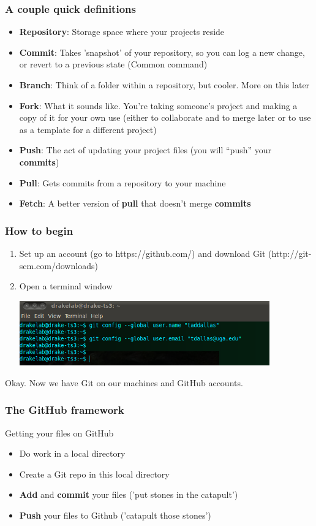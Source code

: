 \documentclass{beamer}\usepackage{graphicx, color}
\begin{document}
\begin{frame}
 \frametitle{A couple quick definitions}
  \begin{itemize}
    \item \textbf{Repository}: Storage space where your projects reside
    \item \textbf{Commit}: Takes 'snapshot' of your repository, so you can log a new change, or revert to a previous state (Common command)
    \item \textbf{Branch}: Think of a folder within a repository, but cooler. More on this later
    \item \textbf{Fork}: What it sounds like. You're taking someone's project and making a copy of it for your own use (either to collaborate and to merge later or to use as a template for a different project)
    \item \textbf{Push}: The act of updating your project files (you will ``push'' your \textbf{commits})
    \item \textbf{Pull}: Gets commits from a repository to your machine
    \item \textbf{Fetch}: A better version of \textbf{pull} that doesn't merge \textbf{commits}
  \end{itemize}
  \end{frame}




\begin{frame}
 \frametitle{How to begin}
\begin{enumerate}
 \item Set up an account (go to https://github.com/) and download Git (http://git-scm.com/downloads)
 \item Open a terminal window
\pause
\begin{center}
 \includegraphics[width=0.85\textwidth]{config.png}
\end{center}
\end{enumerate}
Okay. Now we have Git on our machines and GitHub accounts.
\end{frame}




\begin{frame}
 \frametitle{The GitHub framework}
\begin{block}{Getting your files on GitHub}
\begin{itemize}
 \item Do work in a local directory
 \item Create a Git repo in this local directory 
 \item \textbf{Add} and \textbf{commit} your files ('put stones in the catapult')
 \item \textbf{Push} your files to Github ('catapult those stones')
\end{itemize}
\end{block}


\end{frame}
\end{document}

